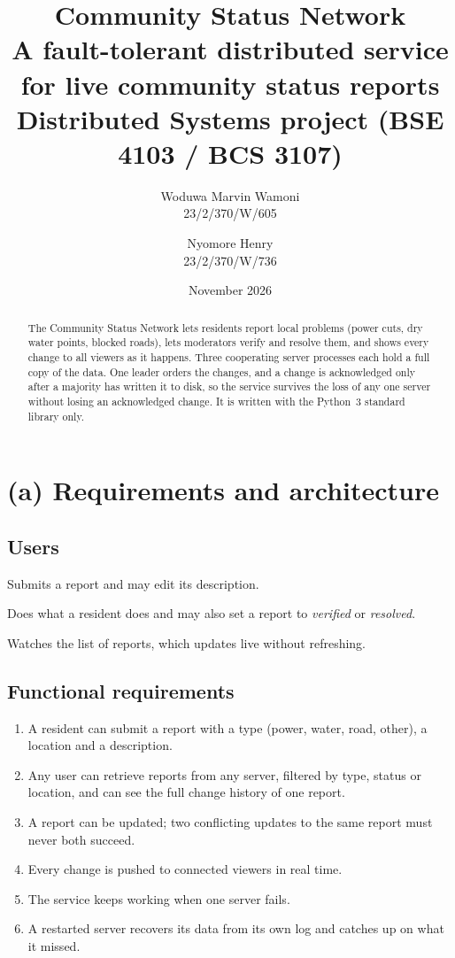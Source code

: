 \documentclass[10pt,a4paper]{article}
\title{\textbf{Community Status Network}\\[4pt]
\large A fault-tolerant distributed service for live community status reports\\[2pt]
\normalsize Distributed Systems project (BSE 4103 / BCS 3107)}
\author{Woduwa Marvin Wamoni\\\small 23/2/370/W/605 \and Nyomore Henry\\\small 23/2/370/W/736}
\date{November 2026}
\begin{document}
\maketitle

\begin{abstract}
\noindent The Community Status Network lets residents report local problems (power cuts, dry
water points, blocked roads), lets moderators verify and resolve them, and shows every change to
all viewers as it happens. Three cooperating server processes each hold a full copy of the data.
One leader orders the changes, and a change is acknowledged only after a majority has written it
to disk, so the service survives the loss of any one server without losing an acknowledged change.
It is written with the Python~3 standard library only.
\end{abstract}

\section{(a) Requirements and architecture}

\subsection{Users}

\begin{description}[leftmargin=2.4cm,style=sameline]
\item[Resident] Submits a report and may edit its description.
\item[Moderator] Does what a resident does and may also set a report to \emph{verified} or
\emph{resolved}.
\item[Viewer] Watches the list of reports, which updates live without refreshing.
\end{description}

\subsection{Functional requirements}

\begin{enumerate}[label=\textbf{FR\arabic*}]
\item A resident can submit a report with a type (power, water, road, other), a location and a
description.
\item Any user can retrieve reports from any server, filtered by type, status or location, and
can see the full change history of one report.
\item A report can be updated; two conflicting updates to the same report must never both
succeed.
\item Every change is pushed to connected viewers in real time.
\item The service keeps working when one server fails.
\item A restarted server recovers its data from its own log and catches up on what it missed.
\end{enumerate}
\end{document}
